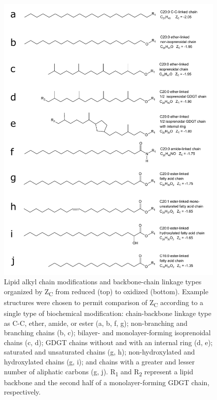 \singlespace
\begin{figure}[h]
\centering
\includegraphics[width=.85\linewidth]{figs_ch1/chain_comparison}
\caption[Lipid alkyl chain modifications and backbone-chain linkage types organized by Z\textsubscript{C}]{Lipid alkyl chain modifications and backbone-chain linkage types organized by Z\textsubscript{C} from reduced (top) to oxidized (bottom). Example structures were chosen to permit comparison of Z\textsubscript{C} according to a single type of biochemical modification: chain-backbone linkage type as C-C, ether, amide, or ester (a, b, f, g); non-branching and branching chains (b, c); bilayer- and monolayer-forming isoprenoidal chains (c, d); GDGT chains without and with an internal ring (d, e); saturated and unsaturated chains (g, h); non-hydroxylated and hydroxylated chains (g, i); and chains with a greater and lesser number of aliphatic carbons (g, j). R\textsubscript{1} and R\textsubscript{2} represent a lipid backbone and the second half of a monolayer-forming GDGT chain, respectively.}
\label{fig:chain_comparison}
\end{figure}
\doublespace


